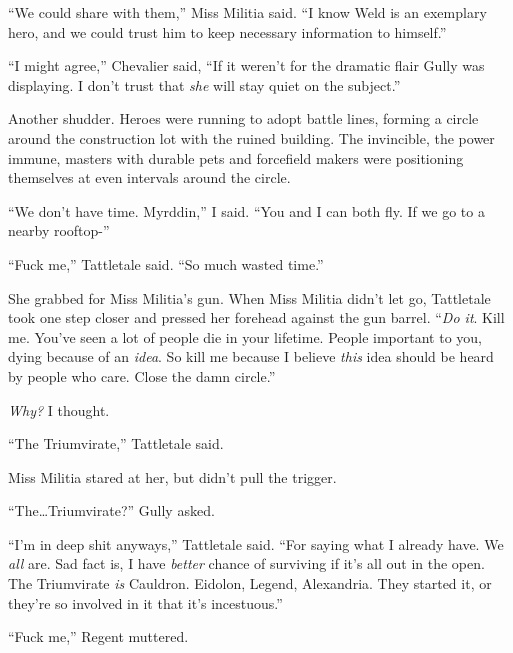 ``We could share with them,'' Miss Militia said.  ``I know Weld is an exemplary hero, and we could trust him to keep necessary information to himself.''



``I might agree,'' Chevalier said, ``If it weren't for the dramatic flair Gully was displaying.  I don't trust that \emph{she} will stay quiet on the subject.''



Another shudder.  Heroes were running to adopt battle lines, forming a circle around the construction lot with the ruined building.  The invincible, the power immune, masters with durable pets and forcefield makers were positioning themselves at even intervals around the circle.



``We don't have time.  Myrddin,'' I said. ``You and I can both fly.  If we go to a nearby rooftop-''



``Fuck me,'' Tattletale said.  ``So much wasted time.''



She grabbed for Miss Militia's gun.  When Miss Militia didn't let go, Tattletale took one step closer and pressed her forehead against the gun barrel.  ``\emph{Do it}.  Kill me.  You've seen a lot of people die in your lifetime.  People important to you, dying because of an \emph{idea}.  So kill me because I believe \emph{this} idea should be heard by people who care.  Close the damn circle.''



\emph{Why?} I thought.



``The Triumvirate,'' Tattletale said.



Miss Militia stared at her, but didn't pull the trigger.



``The\ldots Triumvirate?'' Gully asked.



``I'm in deep shit anyways,'' Tattletale said.  ``For saying what I already have.  We \emph{all} are.  Sad fact is, I have \emph{better }chance of surviving if it's all out in the open.  The Triumvirate \emph{is} Cauldron.  Eidolon, Legend, Alexandria.  They started it, or they're so involved in it that it's incestuous.''



``Fuck me,'' Regent muttered.



